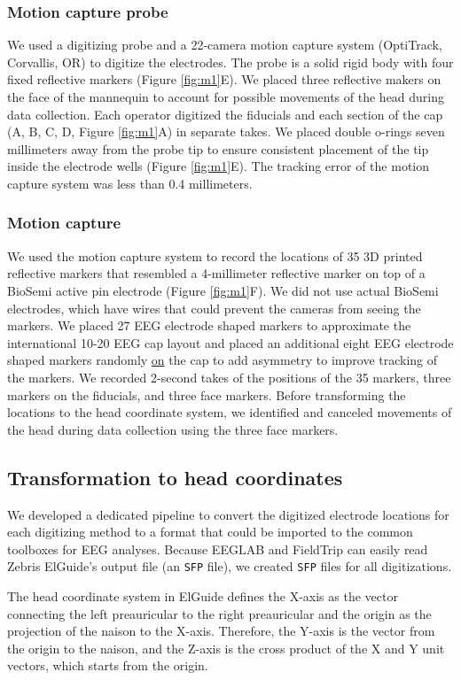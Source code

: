 \documentclass[../thesis_seyed.tex]{subfiles}
\begin{document}
\subsubsection{Motion capture probe}
We used a digitizing probe and a 22-camera motion capture system (OptiTrack, Corvallis, OR) to digitize the electrodes. The probe is a solid rigid body with four fixed reflective markers (Figure \ref{fig:m1}E). We placed three reflective makers on the face of the mannequin to account for possible movements of the head during data collection. Each operator digitized the fiducials and each section of the cap (A, B, C, D, Figure \ref{fig:m1}A) in separate takes. We placed double o-rings seven millimeters away from the probe tip to ensure consistent placement of the tip inside the electrode wells (Figure \ref{fig:m1}E). The tracking error of the motion capture system was less than 0.4 millimeters. 

\subsubsection{Motion capture}
We used the motion capture system to record the locations of 35 3D printed reflective markers that resembled a 4-millimeter reflective marker on top of a BioSemi active pin electrode (Figure \ref{fig:m1}F). We did not use actual BioSemi electrodes, which have wires that could prevent the cameras from seeing the markers. We placed 27 EEG electrode shaped markers to approximate the international 10-20 EEG cap layout and placed an additional eight EEG electrode shaped markers randomly \ul{on} the cap to add asymmetry to improve tracking of the markers. We recorded 2-second takes of the positions of the 35 markers, three markers on the fiducials, and three face markers. Before transforming the locations to the head coordinate system, we identified and canceled movements of the head during data collection using the three face markers.

\subsection{Transformation to head coordinates}
We developed a dedicated pipeline to convert the digitized electrode locations for each digitizing method to a format that could be imported to the common toolboxes for EEG analyses. Because EEGLAB and FieldTrip can easily read Zebris ElGuide's output file (an {\tt SFP} file), we created {\tt SFP} files for all digitizations.

The head coordinate system in ElGuide defines the X-axis as the vector connecting the left preauricular to the right preauricular and the origin as the projection of the naison to the X-axis. Therefore, the Y-axis is the vector from the origin to the naison, and the Z-axis is the cross product of the X and Y unit vectors, which starts from the origin.
\end{document}

